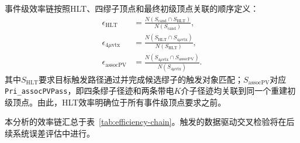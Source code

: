 事件级效率链按照HLT、四缪子顶点和最终初级顶点关联的顺序定义：
\begin{align}
\epsilon_{\mathrm{HLT}}
&=\frac{N(S_{\mathrm{cand}}\cap S_{\mathrm{HLT}})}
        {N(S_{\mathrm{cand}})},\nonumber\\
\epsilon_{4\mu\mathrm{vtx}}
&=\frac{N(S_{\mathrm{HLT}}\cap S_{4\mu\mathrm{vtx}})}
        {N(S_{\mathrm{HLT}})},\nonumber\\
\epsilon_{\mathrm{assocPV}}
&=\frac{N(S_{4\mu\mathrm{vtx}}\cap S_{\mathrm{assocPV}})}
        {N(S_{4\mu\mathrm{vtx}})}.
\label{eq:event-conditional-efficiencies}
\end{align}
其中$S_{\mathrm{HLT}}$要求目标触发路径通过并完成候选缪子的触发对象匹配；$S_{\mathrm{assocPV}}$对应\texttt{Pri\_assocPVPass}，即四条缪子径迹和两条带电$K$介子径迹均关联到同一个重建初级顶点。由此，HLT效率明确位于所有事件级顶点要求之前。

本分析的效率链汇总于表~\ref{tab:efficiency-chain}。触发的数据驱动交叉检验将在后续系统误差评估中进行。

